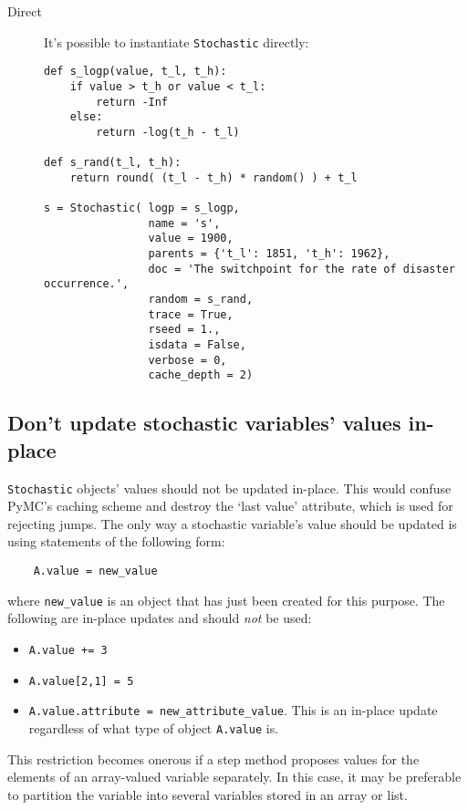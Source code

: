 \begin{description}
    \item[Direct] It's possible to instantiate \texttt{Stochastic} directly:
\begin{verbatim}
def s_logp(value, t_l, t_h):
    if value > t_h or value < t_l:
        return -Inf
    else:
        return -log(t_h - t_l) 

def s_rand(t_l, t_h):
    return round( (t_l - t_h) * random() ) + t_l

s = Stochastic( logp = s_logp, 
                name = 's', 
                value = 1900,
                parents = {'t_l': 1851, 't_h': 1962},
                doc = 'The switchpoint for the rate of disaster occurrence.',
                random = s_rand, 
                trace = True, 
                rseed = 1., 
                isdata = False,
                verbose = 0,
                cache_depth = 2)
\end{verbatim}
\end{description}

\subsection{Don't update stochastic variables' values in-place}\label{sub:warning}

\texttt{Stochastic} objects' values should not be updated in-place. This would confuse PyMC's caching scheme and destroy the `last value' attribute, which is used for rejecting jumps. The only way a stochastic variable's value should be updated is using statements of the following form:
\begin{verbatim}
    A.value = new_value
\end{verbatim}
where \texttt{new_value} is an object that has just been created for this purpose. The following are in-place updates and should \emph{not} be used:
\begin{itemize}
    \item \texttt{A.value += 3}
    \item \texttt{A.value[2,1] = 5}
    \item \texttt{A.value.attribute = new_attribute_value}. This is an in-place update regardless of what type of object \texttt{A.value} is.
\end{itemize}

This restriction becomes onerous if a step method proposes values for the elements of an array-valued variable separately. In this case, it may be preferable to partition the variable into several variables stored in an array or list.

